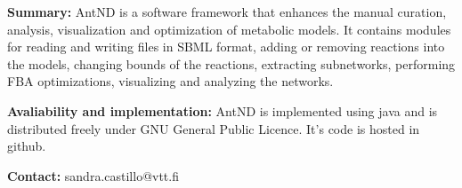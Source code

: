 
\textbf{Summary:} AntND is a software framework that enhances the manual curation, analysis, visualization and optimization of metabolic models. It contains modules for reading and writing files in SBML format, adding or removing reactions into the models, changing bounds of the reactions, extracting subnetworks, performing FBA optimizations, visualizing and analyzing the networks.  

\textbf{Avaliability and implementation:} AntND is implemented using java and is distributed freely under GNU General Public Licence. It's code is hosted in github. 

\textbf{Contact:} sandra.castillo@vtt.fi

